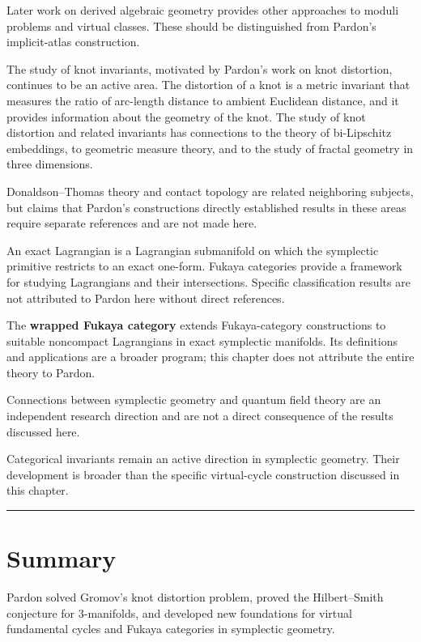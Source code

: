 Later work on derived algebraic geometry provides other approaches to moduli problems and virtual classes. These should be distinguished from Pardon's implicit-atlas construction.

The study of knot invariants, motivated by Pardon's work on knot distortion, continues to be an active area. The distortion of a knot is a metric invariant that measures the ratio of arc-length distance to ambient Euclidean distance, and it provides information about the geometry of the knot. The study of knot distortion and related invariants has connections to the theory of bi-Lipschitz embeddings, to geometric measure theory, and to the study of fractal geometry in three dimensions.

Donaldson--Thomas theory and contact topology are related neighboring subjects, but claims that Pardon’s constructions directly established results in these areas require separate references and are not made here.

An exact Lagrangian is a Lagrangian submanifold on which the symplectic primitive restricts to an exact one-form. Fukaya categories provide a framework for studying Lagrangians and their intersections. Specific classification results are not attributed to Pardon here without direct references.

The \textbf{wrapped Fukaya category} extends Fukaya-category constructions to suitable noncompact Lagrangians in exact symplectic manifolds. Its definitions and applications are a broader program; this chapter does not attribute the entire theory to Pardon.

Connections between symplectic geometry and quantum field theory are an independent research direction and are not a direct consequence of the results discussed here.

Categorical invariants remain an active direction in symplectic geometry. Their development is broader than the specific virtual-cycle construction discussed in this chapter.

\begin{center}\rule{0.5\linewidth}{0.5pt}\end{center}

\section*{Summary}

Pardon solved Gromov's knot distortion problem, proved the Hilbert--Smith conjecture for 3-manifolds, and developed new foundations for virtual fundamental cycles and Fukaya categories in symplectic geometry.
